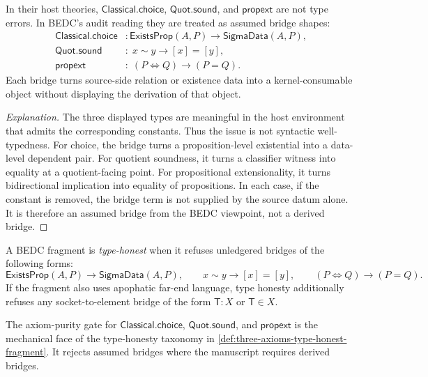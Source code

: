 \begin{principle}
\label{thm:three-axioms-well-typed-assumed-bridges}
In their host theories, $\mathsf{Classical.choice}$, $\mathsf{Quot.sound}$,
and $\mathsf{propext}$ are not type errors. In BEDC's audit reading they are
treated as assumed bridge shapes:
$$
\begin{aligned}
\mathsf{Classical.choice} &:\mathsf{ExistsProp}(A,P)\to\mathsf{SigmaData}(A,P),\\
\mathsf{Quot.sound} &:\; x\sim y\to [x]=[y],\\
\mathsf{propext} &:\; (P\Leftrightarrow Q)\to(P=Q).
\end{aligned}
$$
Each bridge turns source-side relation or existence data into a
kernel-consumable object without displaying the derivation of that object.
\end{principle}

\begin{proof}[Explanation]
The three displayed types are meaningful in the host environment that admits
the corresponding constants. Thus the issue is not syntactic well-typedness.
For choice, the bridge turns a proposition-level existential into a
data-level dependent pair. For quotient soundness, it turns a classifier
witness into equality at a quotient-facing point. For propositional
extensionality, it turns bidirectional implication into equality of
propositions. In each case, if the constant is removed, the bridge term is
not supplied by the source datum alone. It is therefore an assumed bridge
from the BEDC viewpoint, not a derived bridge.
\end{proof}

\begin{definition}
\label{def:three-axioms-type-honest-fragment}
A BEDC fragment is \emph{type-honest} when it refuses unledgered bridges of
the following forms:
$$
\mathsf{ExistsProp}(A,P)\to\mathsf{SigmaData}(A,P),
\qquad
x\sim y\to [x]=[y],
\qquad
(P\Leftrightarrow Q)\to(P=Q).
$$
If the fragment also uses apophatic far-end language, type honesty additionally
refuses any socket-to-element bridge of the form $\mathsf{T}:X$ or
$\mathsf{T}\in X$.
\end{definition}

\begin{principle}
\label{cor:three-axioms-axiom-purity-as-type-honesty}
The axiom-purity gate for $\mathsf{Classical.choice}$, $\mathsf{Quot.sound}$,
and $\mathsf{propext}$ is the mechanical face of the type-honesty taxonomy in
\autoref{def:three-axioms-type-honest-fragment}. It rejects assumed bridges
where the manuscript requires derived bridges.
\end{principle}


